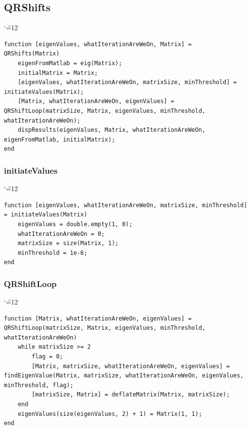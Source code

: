 \documentclass[12pt]{report}
\newenvironment{simplechar}{%
   \catcode`\^=12
}{}
\begin{document}
\newpage
\subsection{QRShifts}
\begin{simplechar}
\begin{lstlisting}
function [eigenValues, whatIterationAreWeOn, Matrix] = QRShifts(Matrix)
    eigenFromMatlab = eig(Matrix);
    initialMatrix = Matrix;
    [eigenValues, whatIterationAreWeOn, matrixSize, minThreshold] = initiateValues(Matrix);
    [Matrix, whatIterationAreWeOn, eigenValues] = QRShiftLoop(matrixSize, Matrix, eigenValues, minThreshold, whatIterationAreWeOn);
    dispResults(eigenValues, Matrix, whatIterationAreWeOn, eigenFromMatlab, initialMatrix);
end
\end{lstlisting}
\end{simplechar}

\subsubsection{initiateValues}
\begin{simplechar}
\begin{lstlisting}
function [eigenValues, whatIterationAreWeOn, matrixSize, minThreshold] = initiateValues(Matrix)
    eigenValues = double.empty(1, 0);
    whatIterationAreWeOn = 0;
    matrixSize = size(Matrix, 1);
    minThreshold = 1e-6;
end

\end{lstlisting}
\end{simplechar}

\newpage
\subsubsection{QRShiftLoop}
\begin{simplechar}
\begin{lstlisting}
function [Matrix, whatIterationAreWeOn, eigenValues] = QRShiftLoop(matrixSize, Matrix, eigenValues, minThreshold, whatIterationAreWeOn)
    while matrixSize >= 2
        flag = 0;
        [Matrix, matrixSize, whatIterationAreWeOn, eigenValues] = findEigenValue(Matrix, matrixSize, whatIterationAreWeOn, eigenValues, minThreshold, flag);
        [matrixSize, Matrix] = deflateMatrix(Matrix, matrixSize);
    end
    eigenValues(size(eigenValues, 2) + 1) = Matrix(1, 1);
end
\end{lstlisting}
\end{simplechar}
\end{document}
